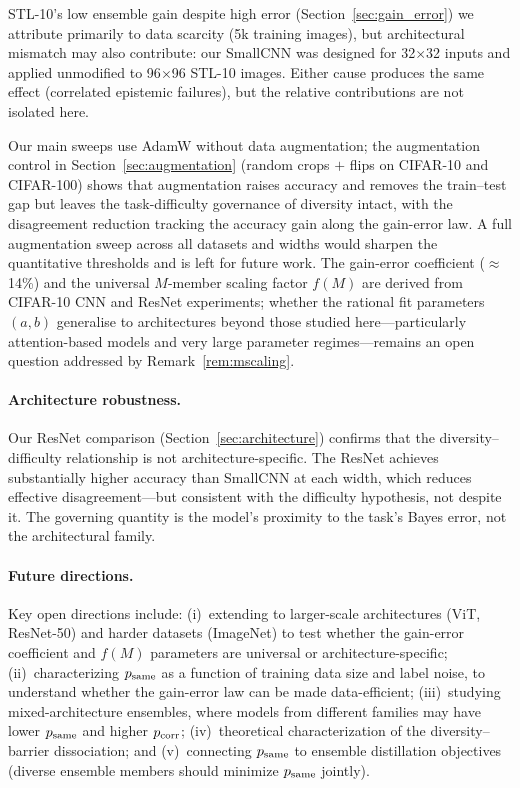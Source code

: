\documentclass[11pt]{article}
\begin{document}
STL-10's low ensemble gain despite high error (Section~\ref{sec:gain_error})
we attribute primarily to data scarcity (5k training images), but
architectural mismatch may also contribute: our SmallCNN was designed for
32$\times$32 inputs and applied unmodified to 96$\times$96 STL-10 images.
Either cause produces the same effect (correlated epistemic failures), but
the relative contributions are not isolated here.

Our main sweeps use AdamW without data augmentation; the augmentation control
in Section~\ref{sec:augmentation} (random crops $+$ flips on CIFAR-10 and
CIFAR-100) shows that augmentation raises accuracy and removes the train--test
gap but leaves the task-difficulty governance of diversity intact, with the
disagreement reduction tracking the accuracy gain along the gain-error law.  A
full augmentation sweep across all datasets and widths would sharpen the
quantitative thresholds and is left for future work.  The gain-error coefficient
($\approx$14\%) and the universal $M$-member scaling factor $f(M)$
are derived from CIFAR-10 CNN and ResNet experiments; whether the rational
fit parameters $(a, b)$ generalise to architectures beyond those studied
here---particularly attention-based models and very large parameter regimes---remains
an open question addressed by Remark~\ref{rem:mscaling}.

\paragraph{Architecture robustness.}
Our ResNet comparison (Section~\ref{sec:architecture}) confirms that the
diversity--difficulty relationship is not architecture-specific.  The
ResNet achieves substantially higher accuracy than SmallCNN at each width,
which reduces effective disagreement---but consistent with the difficulty
hypothesis, not despite it.  The governing quantity is the model's proximity
to the task's Bayes error, not the architectural family.

\paragraph{Future directions.}
Key open directions include: (i)~extending to larger-scale architectures
(ViT, ResNet-50) and harder datasets (ImageNet) to test whether the gain-error
coefficient and $f(M)$ parameters are universal or architecture-specific;
(ii)~characterizing $p_{\rm same}$ as a function of training data size and
label noise, to understand whether the gain-error law can be made data-efficient;
(iii)~studying mixed-architecture ensembles, where models from different
families may have lower $p_{\rm same}$ and higher $p_{\rm corr}$;
(iv)~theoretical characterization of the diversity--barrier dissociation;
and (v)~connecting $p_{\rm same}$ to ensemble distillation objectives
(diverse ensemble members should minimize $p_{\rm same}$ jointly).
\end{document}
